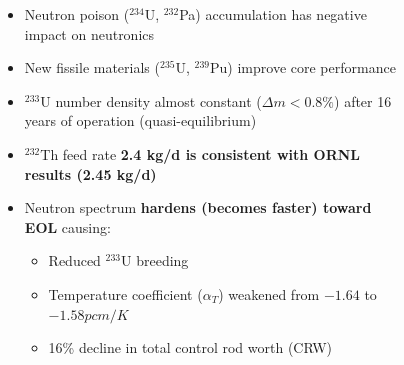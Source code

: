 \begin{frame}
\begin{textblock*}{12.8cm}
\begin{columns}
\begin{figure}[t]
\begin{overprint}
	\end{overprint}
	\end{figure}
	
	\column[t]{5cm}
	\fontsize{7}{9}\selectfont
		\vspace{-3mm}
	\begin{itemize}
		\item<1-> Neutron poison ($^{234}$U, $^{232}$Pa) accumulation has 
		negative impact on neutronics
		\item<1-> New fissile materials ($^{235}$U, $^{239}$Pu) improve core 
		performance
		\item<1-> $^{233}$U number density almost constant ($\Delta m<0.8\%$) 
		after 16 years of operation (quasi-equilibrium)
		\item<1-> $^{232}$Th feed rate \textbf{2.4 kg/d is consistent with 
		ORNL results (2.45 kg/d) \cite{betzler_personal_2017}}
		\item<2-> Neutron spectrum \textbf{hardens (becomes faster) toward 
		EOL} causing:
		\begin{itemize}
			\item<3-> Reduced $^{233}$U breeding
			\item<4->Temperature coefficient ($\alpha_T$) weakened 
			from $-1.64$ to $-1.58pcm/K$
			\item<5->16\% decline in total control rod worth (CRW)
		\end{itemize} 
	\end{itemize}
\end{columns}
\end{textblock*}
\end{frame}


